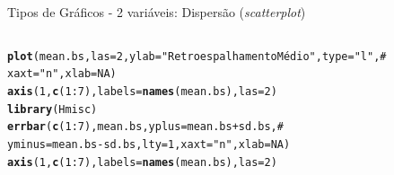 \documentclass{beamer}\usepackage[]{graphicx}\usepackage[]{color}
\makeatletter
\newcommand{\hlnum}[1]{\textcolor[rgb]{0.686,0.059,0.569}{#1}}%
\newcommand{\hlstr}[1]{\textcolor[rgb]{0.192,0.494,0.8}{#1}}%
\newcommand{\hlcom}[1]{\textcolor[rgb]{0.678,0.584,0.686}{\textit{#1}}}%
\newcommand{\hlopt}[1]{\textcolor[rgb]{0,0,0}{#1}}%
\newcommand{\hlstd}[1]{\textcolor[rgb]{0.345,0.345,0.345}{#1}}%
\newcommand{\hlkwc}[1]{\textcolor[rgb]{0.333,0.667,0.333}{#1}}%
\newcommand{\hlkwd}[1]{\textcolor[rgb]{0.737,0.353,0.396}{\textbf{#1}}}%
\newenvironment{kframe}{%
 \def\at@end@of@kframe{}%
 \ifinner\ifhmode%
  \def\at@end@of@kframe{\end{minipage}}%
  \begin{minipage}{\columnwidth}%
 \fi\fi%
 \def\FrameCommand##1{\hskip\@totalleftmargin \hskip-\fboxsep
 \colorbox{shadecolor}{##1}\hskip-\fboxsep
     \hskip-\linewidth \hskip-\@totalleftmargin \hskip\columnwidth}%
 \MakeFramed {\advance\hsize-\width
   \@totalleftmargin\z@ \linewidth\hsize
   \@setminipage}}%
 {\par\unskip\endMakeFramed%
 \at@end@of@kframe}
\newenvironment{knitrout}{}{} %
\renewenvironment{knitrout}{\setlength{\topsep}{0mm}}{}
\makeatother
\begin{document}
\begin{frame}[fragile]{Tipos de Gráficos - 2 variáveis: Dispersão (\emph{scatterplot})}

\begin{columns}[t]


\begin{knitrout}\tiny
{}\color{fgcolor}\begin{kframe}
\begin{alltt}
\hlkwd{plot}\hlstd{(mean.bs,}\hlkwc{las}\hlstd{=}\hlnum{2}\hlstd{,}\hlkwc{ylab}\hlstd{=}\hlstr{"Retroespalhamento Médio"}\hlstd{,}\hlkwc{type}\hlstd{=}\hlstr{"l"}\hlstd{,}\hlcom{#}
     \hlkwc{xaxt}\hlstd{=}\hlstr{"n"}\hlstd{,}\hlkwc{xlab}\hlstd{=}\hlnum{NA}\hlstd{)}
\hlkwd{axis}\hlstd{(}\hlnum{1}\hlstd{,}\hlkwd{c}\hlstd{(}\hlnum{1}\hlopt{:}\hlnum{7}\hlstd{),}\hlkwc{labels}\hlstd{=}\hlkwd{names}\hlstd{(mean.bs),}\hlkwc{las}\hlstd{=}\hlnum{2}\hlstd{)}
\hlkwd{library}\hlstd{(Hmisc)}
\hlkwd{errbar}\hlstd{(}\hlkwd{c}\hlstd{(}\hlnum{1}\hlopt{:}\hlnum{7}\hlstd{),mean.bs,}\hlkwc{yplus}\hlstd{=mean.bs}\hlopt{+}\hlstd{sd.bs,}\hlcom{#}
       \hlkwc{yminus}\hlstd{=mean.bs}\hlopt{-}\hlstd{sd.bs,}\hlkwc{lty}\hlstd{=}\hlnum{1}\hlstd{,}\hlkwc{xaxt}\hlstd{=}\hlstr{"n"}\hlstd{,}\hlkwc{xlab}\hlstd{=}\hlnum{NA}\hlstd{)}
\hlkwd{axis}\hlstd{(}\hlnum{1}\hlstd{,}\hlkwd{c}\hlstd{(}\hlnum{1}\hlopt{:}\hlnum{7}\hlstd{),}\hlkwc{labels}\hlstd{=}\hlkwd{names}\hlstd{(mean.bs),}\hlkwc{las}\hlstd{=}\hlnum{2}\hlstd{)}
\end{alltt}
\end{kframe}
\end{knitrout}



\end{columns}
\end{frame}
\end{document}

